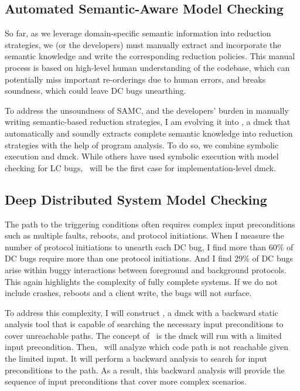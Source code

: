 \documentclass[11pt]{article}
\begin{document}
\subsection{Automated Semantic-Aware Model Checking} 

So far, as we leverage domain-specific semantic information into reduction
strategies, we (or the developers) must manually extract and incorporate the
semantic knowledge and write the corresponding reduction policies. This manual
process is based on high-level human understanding of the codebase, which can
potentially miss important re-orderings due to human errors, and breaks
soundness, which could leave DC bugs unearthing.

To address the unsoundness of SAMC, and the developers' burden in manually
writing semantic-based reduction strategies, I am evolving it into \autocheck, a
dmck that automatically and soundly extracts complete semantic knowledge into
reduction strategies with the help of program analysis. To do so, we combine
symbolic execution and dmck. While others have used symbolic execution with
model checking for LC bugs, \autocheck\ will be the first case for
implementation-level dmck. 

\subsection{Deep Distributed System Model Checking}

The path to the triggering conditions often requires complex input preconditions
such as multiple faults, reboots, and protocol initiations. When I measure the
number of protocol initiations to unearth each DC bug, I find more than 60\% of
DC bugs require more than one protocol initiations. And I find 29\% of DC bugs
arise within buggy interactions between foreground and background protocols.
This again highlights the complexity of fully complete systems. If we do not
include crashes, reboots and a client write, the bugs will not surface.

To address this complexity, I will construct \deepcheck, a dmck with a backward
static analysis tool that is capable of searching the necessary input
preconditions to cover unreachable paths. The concept of \deepcheck\ is the dmck
will run with a limited input precondition. Then, \deepcheck\ will analyze which
code path is not reachable given the limited input. It will perform a backward
analysis to search for input preconditions to the path. As a result, this
backward analysis will provide the sequence of input preconditions that cover
more complex scenarios.
\end{document}
